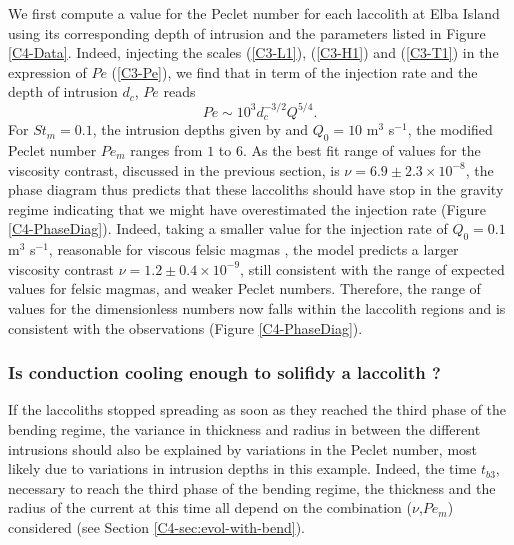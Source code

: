 We first compute  a value for the Peclet number  for each laccolith at
Elba  Island  using  its  corresponding depth  of  intrusion  and  the
parameters  listed in  Figure  \ref{C4-Data}.   Indeed, injecting  the
scales   (\ref{C3-L1}),  (\ref{C3-H1})   and   (\ref{C3-T1})  in   the
expression  of  $Pe$  (\ref{C3-Pe}),  we  find that  in  term  of  the
injection rate and the depth of intrusion $d_c$, $Pe$ reads
\begin{equation}
  Pe \sim 10^3 d_c^{-3/2} Q^{5/4}.
\end{equation}
For $St_m  =0.1$, the intrusion depths  given by \citet{Rocchi:2002jy}
and  $Q_0 =10$  m$^{3}$ s$^{-1}$,  the modified  Peclet number  $Pe_m$
ranges from  $1$ to  $6$.  As  the best  fit range  of values  for the
viscosity   contrast,   discussed   in  the   previous   section,   is
$\nu =  6.9\pm 2.3  \times 10^{-8}$, the  phase diagram  thus predicts
that  these  laccoliths  should  have   stop  in  the  gravity  regime
indicating that we might have overestimated the injection rate (Figure
\ref{C4-PhaseDiag}).  Indeed, taking a smaller value for the injection
rate  of $Q_0=0.1$  m$^{3}$  s$^{-1}$, reasonable  for viscous  felsic
magmas \citep{Harris:2000jd},  the model  predicts a  larger viscosity
contrast  $\nu=1.2\pm0.4\times  10^{-9}$,  still consistent  with  the
range  of  expected  values  for  felsic  magmas,  and  weaker  Peclet
numbers. Therefore, the range of  values for the dimensionless numbers
now  falls within  the laccolith  regions and  is consistent  with the
observations (Figure \ref{C4-PhaseDiag}).

\subsubsection*{Is   conduction   cooling   enough   to   solifidy   a
  laccolith ?}

If the laccoliths stopped spreading as  soon as they reached the third
phase of the  bending regime, the variance in thickness  and radius in
between  the   different  intrusions  should  also   be  explained  by
variations  in the  Peclet number,  most likely  due to  variations in
intrusion  depths  in  this   example.   Indeed,  the  time  $t_{b3}$,
necessary  to  reach  the  third  phase of  the  bending  regime,  the
thickness and the radius of the current at this time all depend on the
combination      ($\nu$,$Pe_m$)      considered      (see      Section
\ref{C4-sec:evol-with-bend}).

